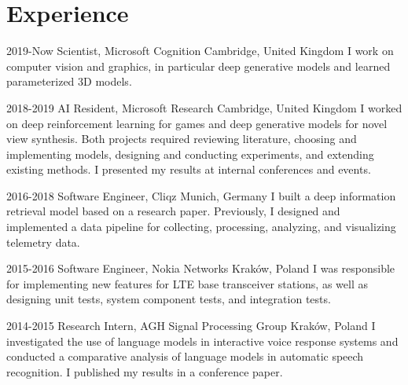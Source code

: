\documentclass[]{friggeri-cv_osx}
\begin{document}
\vspace{5mm}
\begin{center}
\href{https://sebastiandziadzio.com}{\color{gray} \Large \faHome} \hspace{0.05cm}
\href{https://github.com/sebastiandziadzio}{\color{gray} \Large \faGithub} \hspace{0.05cm}
\href{mailto:sebastian.dziadzio@gmail.com}{\color{gray} \Large\faEnvelope} \hspace{0.05cm}
\href{https://twitter.com/sebadzia}{\color{gray} \Large\faTwitter} \hspace{0.05cm}
\href{https://pl.linkedin.com/in/sebastiandziadzio}{\color{gray} \Large\faLinkedin} \hspace{0.05cm}
\end{center}

\section{Experience}
\begin{entrylist}
\entry
{2019-Now}
{Scientist, Microsoft Cognition}
{Cambridge, United Kingdom}
{I work on computer vision and graphics, in particular deep generative models and learned parameterized 3D models.\\}

\entry
{2018-2019}
{AI Resident, Microsoft Research}
{Cambridge, United Kingdom}
{I worked on deep reinforcement learning for games and deep generative models for novel view synthesis. Both projects required
reviewing literature, choosing and implementing models, designing and conducting experiments, and extending existing methods.
I presented my results at internal conferences and events.\\}

\entry
{2016-2018}
{Software Engineer, Cliqz}
{Munich, Germany}
{I built a deep information retrieval model based on a research paper. Previously, I designed and implemented a data pipeline for
collecting, processing, analyzing, and visualizing telemetry data.\\}

\entry
{2015-2016}
{Software Engineer, Nokia Networks}
{Kraków, Poland}
{I was responsible for implementing new features for LTE base transceiver stations, as well as designing unit tests, system component tests,
and integration tests.\\}

\entry
{2014-2015}
{Research Intern, AGH Signal Processing Group}
{Kraków, Poland}
{I investigated the use of language models in interactive voice response systems and conducted a comparative analysis of language models
in automatic speech recognition. I published my results in a conference paper.\\}
\end{entrylist}
\end{document}
